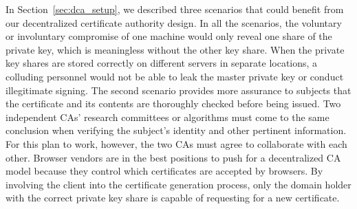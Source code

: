 In Section~\ref{sec:dca_setup}, we described three scenarios that could benefit from our decentralized certificate authority design. In all the scenarios, the voluntary or involuntary compromise of one machine would only reveal one share of the private key, which is meaningless without the other key share. When the private key shares are stored correctly on different servers in separate locations, a colluding personnel would not be able to leak the master private key or conduct illegitimate signing. The second scenario provides more assurance to subjects that the certificate and its contents are thoroughly checked before being issued. Two independent CAs' research committees or algorithms must come to the same conclusion when verifying the subject's identity and other pertinent information. For this plan to work, however, the two CAs must agree to collaborate with each other. Browser vendors are in the best positions to push for a decentralized CA model because they control which certificates are accepted by browsers.
By involving the client into the certificate generation process, only the domain holder with the correct private key share is capable of requesting for a new certificate. 
